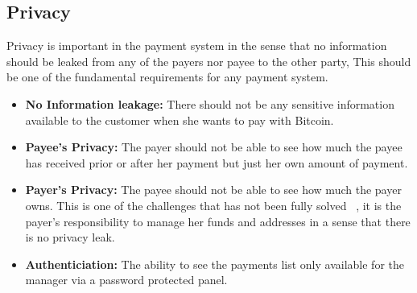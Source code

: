 \subsection{Privacy} Privacy is important in the payment system in the sense that no information should be leaked from any of the payers nor payee to the other party, This should be one of the fundamental requirements for any payment system.
\begin{itemize}

\item \textbf{No Information leakage: }There should not be any sensitive information available to the customer when she wants to pay with Bitcoin.

\item \textbf{Payee's Privacy: }The payer should not be able to see how much the payee has received prior or after her payment but just her own amount of payment.

\item \textbf{Payer's Privacy: }The payee should not be able to see how much the payer owns. This is one of the challenges that has not been fully solved ~\cite{androulaki2013evaluating}, it is the payer's responsibility to manage her funds and addresses in a sense that there is no privacy leak.

\item \textbf{Authenticiation: }The ability to see the payments list only available for the manager via a password protected panel.

\end{itemize}
